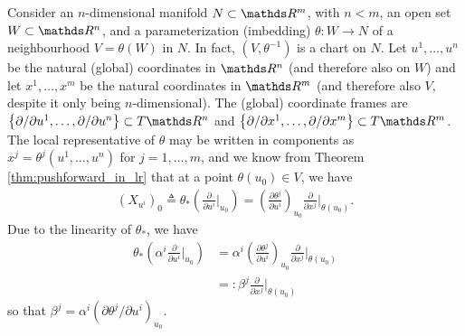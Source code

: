 Consider an $n$-dimensional manifold $N\subset \R^m$, with $n<m$, an open set $W\subset \R^n$, and a parameterization (imbedding) $\theta: W\rightarrow N$ of a neighbourhood $V = \theta(W)$ in $N$. In fact, $(V, \theta^{-1})$ is a chart on $N$. Let $u^1, \dots, u^n$ be the natural (global) coordinates in $\R^n$ (and therefore also on $W$) and let $x^1, \dots, x^m$ be the natural coordinates in $\R^m$ (and therefore also $V$, despite it only being $n$-dimensional). The (global) coordinate frames are $\left\{\partial / \partial u^1, \dots, \partial / \partial u^n\right\} \subset T\R^n $ and $\left\{\partial / \partial x^1, \dots, \partial / \partial x^m\right\} \subset T\R^m$. 
The local representative of $\theta$ may be written in components as $x^j = \theta^j(u^1, \dots, u^n)$ for $j = 1, \dots, m$, and we know from Theorem \ref{thm:pushforward_in_lr} that at a point $\theta(u_0)\in V$, we have
\begin{equation}\begin{aligned}\label{eq:parameterized_tangent_vec}
 \left(X_{u^i}\right)_0 \triangleq \theta_*\left( \frac{\partial}{\partial u^i}\biggr|_{u_0}\right) = \left(\frac{\partial \theta^j}{\partial u^i}\right)_{u_0} \frac{\partial}{\partial {x^{j}}}\biggr|_{\theta(u_0)}.
 \end{aligned}\end{equation}
Due to the linearity of $\theta_*$, we have %
\begin{equation}\begin{aligned}
\theta_* \left(\alpha^i \frac{\partial}{\partial u^i}\biggr|_{u_0}\right) &={} \alpha^i \left(\frac{\partial \theta^j}{\partial u^i}\right)_{u_0} \frac{\partial}{\partial {x^{j}}}\biggr|_{\theta(u_0)}\\
&=: \beta^j \frac{\partial}{\partial {x^{j}}}\biggr|_{\theta(u_0)}
\end{aligned}\end{equation}
so that $\beta^j = \alpha^i \left({\partial \theta^j}/{\partial u^i}\right)_{u_0}$. 

